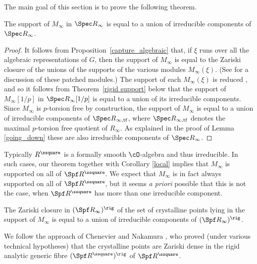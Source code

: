 The main goal of this section is to prove the following theorem.

\begin{thm}
\label{thm:support}
The support
of $M_{\infty}$ in $\Spec R_{\infty}$ is equal to
a union of irreducible components of $\Spec R_{\infty}$.
\end{thm}

\begin{proof}
It follows from Proposition~\ref{capture_algebraic}
that, if $\xi$ runs over all the algebraic representations
of $G$, then the support of $M_{\infty}$ is
equal to the Zariski closure of the unions of the supports
of the various modules $M_{\infty}(\xi)$.
(See \cite{six-authors} for a discussion of these patched
modules.)
The support of each $M_{\infty}(\xi)$ is reduced
\cite[Lem.\,4.17]{six-authors},
and so it follows from Theorem~\ref{rigid support}
below that the support of $M_\infty[1/p]$ in $\Spec R_{\infty}[1/p]$ is equal to
a union of its irreducible components. Since $M_{\infty}$ is $p$-torsion free
by construction, the support of $M_{\infty}$ is equal to a union of irreducible components
of $\Spec R_{\infty, \mathrm{tf}}$, where $\Spec R_{\infty, \mathrm{tf}}$ denotes the maximal
$p$-torsion free quotient of $R_{\infty}$. As explained in the proof of Lemma \ref{going_down}
these are also irreducible components of $\Spec R_{\infty}$.
\end{proof}

\begin{remark} Typically $R^\ssquare$
is a formally smooth $\cO$-algebra and thus irreducible.
In such cases, our theorem together with Corollary \ref{local} implies
that $M_{\infty}$ is supported on all of $\Spf R^\ssquare$. We expect that $M_{\infty}$ is in fact
always supported on all of $\Spf R^\ssquare$, but it seems {\em a priori}
possible that this is not the case, when $\Spf R^\ssquare$
has more than one irreducible component.
\end{remark}

\begin{thm}
\label{rigid support}
The Zariski closure in $(\Spf R_{\infty})^{\rig}$
of the set of crystalline points \hbox{lying} in the support of $M_{\infty}$ is
equal to
a union of irreducible components of $(\Spf R_{\infty})^{\rig}$.
\end{thm}

We follow the approach of Chenevier \cite{Chenevier}
and Nakamura \cite{Nakamura}, who proved (under various technical
hypotheses) that
the crystalline points are Zariski dense in the rigid analytic generic
fibre $(\Spf R^\ssquare)^{\rig}$
of $\Spf R^\ssquare$.

